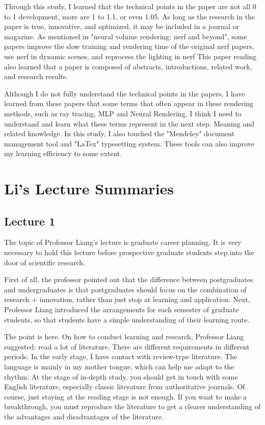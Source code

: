 \documentclass[UTF-8]{ctexart}
\begin{document}
Through this study, I learned that the technical points in the paper are not all 0 to 1 development, more are 1 to 1.1, or even 1.05. As long as the research in the paper is true, innovative, and optimized, it may be included in a journal or magazine. As mentioned in "neural volume rendering: nerf and beyond", some papers improve the slow training and rendering time of the original nerf papers, use nerf in dynamic scenes, and reprocess the lighting in nerf This paper reading also learned that a paper is composed of abstracts, introductions, related work, and research results.

Although I do not fully understand the technical points in the papers, I have learned from these papers that some terms that often appear in these rendering methods, such as ray tracing, MLP and Neural Rendering. I think I need to understand and learn what these terms represent in the next step. Meaning and related knowledge. In this study, I also touched the "Mendeley" document management tool and "LaTex" typesetting system. These tools can also improve my learning efficiency to some extent.

\section{Li's Lecture Summaries}
\subsection{Lecture 1}
The topic of Professor Liang's lecture is graduate career planning. It is very necessary to hold this lecture before prospective graduate students step into the door of scientific research. 

First of all, the professor pointed out that the difference between postgraduates and undergraduates is that postgraduates should focus on the combination of research + innovation, rather than just stop at learning and application. Next, Professor Liang introduced the arrangements for each semester of graduate students, so that students have a simple understanding of their learning route. 

The point is here. On how to conduct learning and research, Professor Liang suggested: read a lot of literature. There are different requirements in different periods. In the early stage, I have contact with review-type literature. The language is mainly in my mother tongue, which can help me adapt to the rhythm. At the stage of in-depth study, you should get in touch with some English literature, especially classic literature from authoritative journals. Of course, just staying at the reading stage is not enough. If you want to make a breakthrough, you must reproduce the literature to get a clearer understanding of the advantages and disadvantages of the literature. 
\end{document}
